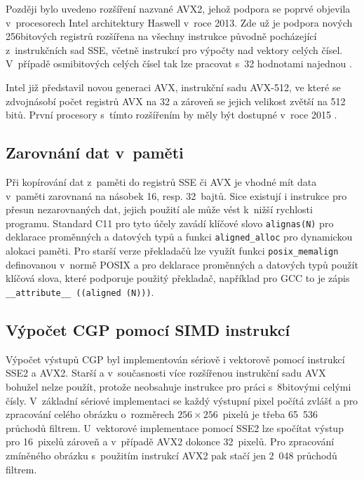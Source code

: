 Později bylo uvedeno rozšíření nazvané AVX2, jehož podpora se poprvé objevila v~procesorech Intel architektury Haswell v~roce 2013. Zde už je podpora nových 256bitových registrů rozšířena na všechny instrukce původně pocházející z~instrukčních sad SSE, včetně instrukcí pro výpočty nad vektory celých čísel. V~případě osmibitových celých čísel tak lze pracovat s~32 hodnotami najednou \cite{IntelAVXReference}.

Intel již představil novou generaci AVX, instrukční sadu AVX-512, ve které se zdvojnásobí počet registrů AVX na 32 a zároveň se jejich velikost zvětší na 512 bitů. První procesory s~tímto rozšířením by měly být dostupné v~roce 2015 \cite{IntelAvx512}.

\subsection{Zarovnání dat v~paměti}

Při kopírování dat z~paměti do registrů SSE či AVX je vhodné mít data v~paměti zarovnaná na násobek 16, resp. 32~bajtů. Sice existují i instrukce pro přesun nezarovnaných dat, jejich použití ale může vést k~nižší rychlosti programu. Standard C11 pro tyto účely zavádí klíčové slovo \texttt{alignas(N)} pro deklarace proměnných a datových typů a funkci \texttt{aligned\_alloc} pro dynamickou alokaci paměti. Pro starší verze překladačů lze využít funkci \texttt{posix\_memalign} definovanou v~normě POSIX a pro deklarace proměnných a datových typů použít klíčová slova, které podporuje použitý překladač, například pro GCC to je zápis \texttt{\_\_attribute\_\_~((aligned~(N)))}.

\subsection{Výpočet CGP pomocí SIMD instrukcí}

Výpočet výstupů CGP byl implementován sériově i vektorově pomocí instrukcí SSE2 a AVX2. Starší a v~současnosti více rozšířenou instrukční sadu AVX bohužel nelze použít, protože neobsahuje instrukce pro práci s~8bitovými celými čísly. V~základní sériové implementaci se každý výstupní pixel počítá zvlášť a pro zpracování celého obrázku o~rozměrech $256\times256$~pixelů je třeba 65~536 průchodů filtrem. U~vektorové implementace pomocí SSE2 lze spočítat výstup pro 16~pixelů zároveň a v~případě AVX2 dokonce 32~pixelů. Pro zpracování zmíněného obrázku s~použitím instrukcí AVX2 pak stačí jen 2~048 průchodů filtrem.

